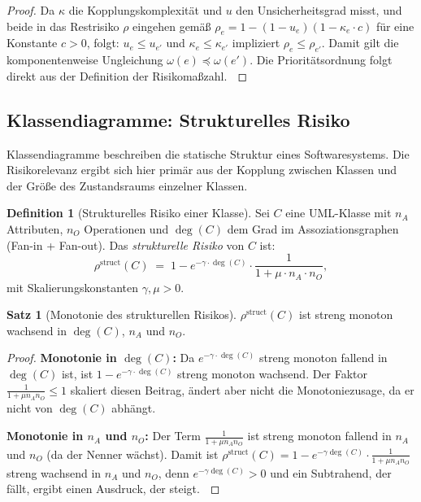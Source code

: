 ﻿\documentclass[a4paper,12pt]{article}
\theoremstyle{definition}
\newtheorem{definition}{Definition}
\newtheorem{satz}{Satz}
\newenvironment{beweis}{\begin{proof}}{\end{proof}}
\begin{document}
\begin{beweis}
    Da $\kappa$ die Kopplungskomplexit\"at und $u$ den Unsicherheitsgrad misst,
    und beide in das Restrisiko $\rho$ eingehen gem\"a\ss{}
    $\rho_e = 1 - (1-u_e)(1-\kappa_e \cdot c)$ f\"ur eine Konstante $c > 0$,
    folgt: $u_e \leq u_{e'}$ und $\kappa_e \leq \kappa_{e'}$ impliziert
    $\rho_e \leq \rho_{e'}$. Damit gilt die komponentenweise Ungleichung
    $\omega(e) \preceq \omega(e')$. Die Priorit\"atsordnung folgt direkt aus
    der Definition der Risikoma\ss{}zahl. $\qedhere$
\end{beweis}

\subsection{Klassendiagramme: Strukturelles Risiko}

Klassendiagramme beschreiben die statische Struktur eines Softwaresystems. Die
Risikorelevanz ergibt sich hier prim\"ar aus der Kopplung zwischen Klassen und
der Gr\"o\ss{}e des Zustandsraums einzelner Klassen.

\begin{definition}[Strukturelles Risiko einer Klasse]
\label{def:strukturrisiko}
    Sei $C$ eine UML-Klasse mit $n_A$ Attributen, $n_O$ Operationen und
    $\deg(C)$ dem Grad im Assoziationsgraphen (Fan-in + Fan-out). Das
    \emph{strukturelle Risiko} von $C$ ist:
    \[
        \rho^{\mathrm{struct}}(C) \;=\; 1 - e^{-\gamma \cdot \deg(C)} \cdot
        \frac{1}{1 + \mu \cdot n_A \cdot n_O},
    \]
    mit Skalierungskonstanten $\gamma, \mu > 0$.
\end{definition}

\begin{satz}[Monotonie des strukturellen Risikos]
\label{satz:strukturrisiko-monoton}
    $\rho^{\mathrm{struct}}(C)$ ist streng monoton wachsend in $\deg(C)$, $n_A$ und
    $n_O$.
\end{satz}

\begin{beweis}
    \textbf{Monotonie in $\deg(C)$:} Da $e^{-\gamma \cdot \deg(C)}$ streng monoton
    fallend in $\deg(C)$ ist, ist $1 - e^{-\gamma \cdot \deg(C)}$ streng monoton
    wachsend. Der Faktor $\frac{1}{1+\mu n_A n_O} \leq 1$ skaliert diesen Beitrag,
    \"andert aber nicht die Monotoniezusage, da er nicht von $\deg(C)$ abh\"angt.

    \textbf{Monotonie in $n_A$ und $n_O$:} Der Term $\frac{1}{1 + \mu n_A n_O}$
    ist streng monoton fallend in $n_A$ und $n_O$ (da der Nenner w\"achst). Damit
    ist $\rho^{\mathrm{struct}}(C) = 1 - e^{-\gamma \deg(C)} \cdot \frac{1}{1+\mu n_A n_O}$
    streng wachsend in $n_A$ und $n_O$, denn $e^{-\gamma \deg(C)} > 0$ und ein
    Subtrahend, der f\"allt, ergibt einen Ausdruck, der steigt. $\qedhere$
\end{beweis}
\end{document}
